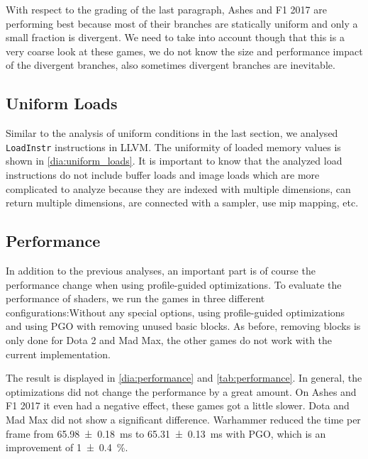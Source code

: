 With respect to the grading of the last paragraph, Ashes and F1 2017 are performing best because most of their branches are statically uniform and only a small fraction is divergent.
We need to take into account though that this is a very coarse look at these games, we do not know the size and performance impact of the divergent branches, also sometimes divergent branches are inevitable.

\subsection{Uniform Loads}
\label{sub:eval_uniform_loads}
Similar to the analysis of uniform conditions in the last section, we analysed \texttt{LoadInstr} instructions in LLVM.
The uniformity of loaded memory values is shown in \cref{dia:uniform_loads}.
It is important to know that the analyzed load instructions do not include buffer loads and image loads which are more complicated to analyze because they are indexed with multiple dimensions, can return multiple dimensions, are connected with a sampler, use mip mapping, etc.


\subsection{Performance}
\label{sub:eval_perf}
In addition to the previous analyses, an important part is of course the performance change when using profile-guided optimizations.
To evaluate the performance of shaders, we run the games in three different configurations:Without any special options, using profile-guided optimizations and using PGO with removing unused basic blocks.
As before, removing blocks is only done for Dota 2 and Mad Max, the other games do not work with the current implementation.


\begin{table}
	\centering
	\label{tab:performance}
\end{table}

The result is displayed in \cref{dia:performance} and \cref{tab:performance}.
In general, the optimizations did not change the performance by a great amount.
On Ashes and F1 2017 it even had a negative effect, these games got a little slower.
Dota and Mad Max did not show a significant difference.
Warhammer reduced the time per frame from \SI{65.98 \pm 0.18}{\milli\second} to \SI{65.31 \pm 0.13}{\milli\second} with PGO, which is an improvement of \SI{1 \pm 0.4}{\percent}.

